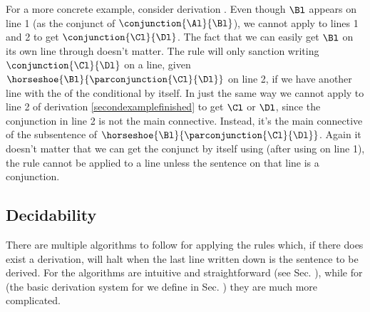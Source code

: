 For a more concrete example, consider derivation . 
Even though $\Bl$ appears on line 1 (as the conjunct of $\conjunction{\Al}{\Bl}$), we cannot apply  to lines 1 and 2 to get $\conjunction{\Cl}{\Dl}$. 
The fact that we can easily get $\Bl$ on its own line through  doesn't matter. 
The rule  will only sanction writing $\conjunction{\Cl}{\Dl}$ on a line, given $\horseshoe{\Bl}{\parconjunction{\Cl}{\Dl}}$ on line 2, if we have another line with the  of the conditional by itself. 
In just the same way we cannot apply  to line 2 of derivation \ref{secondexamplefinished} to get $\Cl$ or $\Dl$, since the conjunction in line 2 is not the main connective. 
Instead, it's the main connective of the  subsentence of $\horseshoe{\Bl}{\parconjunction{\Cl}{\Dl}}$. 
Again it doesn't matter that we can get the conjunct by itself using  (after using  on line 1), the rule  cannot be applied to a line unless the sentence on that line is a conjunction. 

\subsection{Decidability}\label{Section:Intro to Decidability}
There are multiple algorithms to follow for applying the rules which, if there does exist a derivation, will halt when the last line written down is the sentence to be derived. 
For \GSD{} the algorithms are intuitive and straightforward (see Sec. ), while for \GQD{} (the basic derivation system for \GQL{} we define in Sec. ) they are much more complicated.

